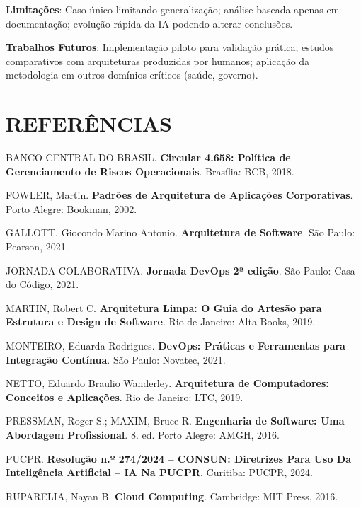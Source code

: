 \textbf{Limitações}: Caso único limitando generalização; análise baseada apenas em documentação; evolução rápida da IA podendo alterar conclusões.

\textbf{Trabalhos Futuros}: Implementação piloto para validação prática; estudos comparativos com arquiteturas produzidas por humanos; aplicação da metodologia em outros domínios críticos (saúde, governo).

\chapter{REFERÊNCIAS}

BANCO CENTRAL DO BRASIL. \textbf{Circular 4.658: Política de Gerenciamento de Riscos Operacionais}. Brasília: BCB, 2018.

FOWLER, Martin. \textbf{Padrões de Arquitetura de Aplicações Corporativas}. Porto Alegre: Bookman, 2002.

GALLOTT, Giocondo Marino Antonio. \textbf{Arquitetura de Software}. São Paulo: Pearson, 2021.

JORNADA COLABORATIVA. \textbf{Jornada DevOps 2ª edição}. São Paulo: Casa do Código, 2021.

MARTIN, Robert C. \textbf{Arquitetura Limpa: O Guia do Artesão para Estrutura e Design de Software}. Rio de Janeiro: Alta Books, 2019.

MONTEIRO, Eduarda Rodrigues. \textbf{DevOps: Práticas e Ferramentas para Integração Contínua}. São Paulo: Novatec, 2021.

NETTO, Eduardo Braulio Wanderley. \textbf{Arquitetura de Computadores: Conceitos e Aplicações}. Rio de Janeiro: LTC, 2019.

PRESSMAN, Roger S.; MAXIM, Bruce R. \textbf{Engenharia de Software: Uma Abordagem Profissional}. 8. ed. Porto Alegre: AMGH, 2016.

PUCPR. \textbf{Resolução n.º 274/2024 – CONSUN: Diretrizes Para Uso Da Inteligência Artificial – IA Na PUCPR}. Curitiba: PUCPR, 2024.

RUPARELIA, Nayan B. \textbf{Cloud Computing}. Cambridge: MIT Press, 2016.


